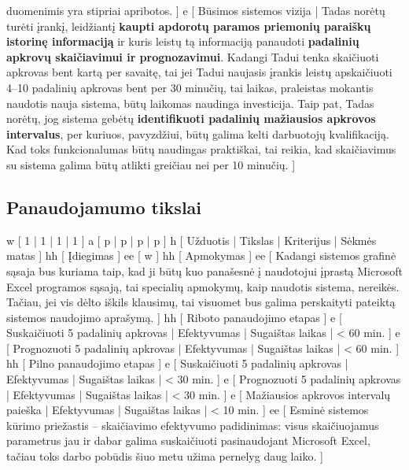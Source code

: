 {    duomenimis yra stipriai apribotos.
  ]
  e [ Būsimos sistemos vizija
  | 
    Tadas norėtų turėti įrankį, leidžiantį \textbf{kaupti apdorotų paramos priemonių paraiškų
    istorinę informaciją} ir kuris leistų tą informaciją panaudoti \textbf{padalinių apkrovų 
    skaičiavimui ir prognozavimui}.
    Kadangi Tadui tenka skaičiuoti apkrovas bent kartą per savaitę, tai jei Tadui naujasis 
    įrankis leistų apskaičiuoti 4–10 padalinių apkrovas bent per 30 minučių, 
    tai laikas, praleistas mokantis naudotis nauja sistema, būtų laikomas naudinga investicija.
    Taip pat, Tadas norėtų, jog sistema gebėtų \textbf{identifikuoti padalinių
    mažiausios apkrovos intervalus}, per kuriuos, pavyzdžiui, būtų galima kelti darbuotojų
    kvalifikaciją. Kad toks funkcionalumas būtų naudingas praktiškai, tai 
    reikia, kad skaičiavimus su sistema galima būtų atlikti greičiau
    nei per 10 minučių.
  ]
}

\subsection{Panaudojamumo tikslai}
\xtable
{
  w [ 1 | 1 | 1 | 1 ]
  a [ p | p | p | p ]
  h [ Užduotis | Tikslas | Kriterijus | Sėkmės matas ]
  hh [ Įdiegimas ]
  ee [ w ]
  hh [ Apmokymas ]
  ee 
  [ 
    Kadangi sistemos grafinė sąsaja bus kuriama taip, kad ji būtų kuo
    panašesnė į naudotojui įprastą Microsoft Excel programos sąsają,
    tai specialių apmokymų, kaip naudotis sistema, nereikės. Tačiau,
    jei vis dėlto iškils klausimų, tai visuomet bus galima perskaityti
    pateiktą sistemos naudojimo aprašymą.
  ]
  hh [ Riboto panaudojimo etapas ]
  e [ Suskaičiuoti 5 padalinių apkrovas | Efektyvumas | Sugaištas laikas | < 60 min. ]
  e [ Prognozuoti 5 padalinių apkrovas | Efektyvumas | Sugaištas laikas | < 60 min. ]
  hh [ Pilno panaudojimo etapas ]
  e [ Suskaičiuoti 5 padalinių apkrovas | Efektyvumas | Sugaištas laikas | < 30 min. ]
  e [ Prognozuoti 5 padalinių apkrovas | Efektyvumas | Sugaištas laikas | < 30 min. ]
  e [ Mažiausios apkrovos intervalų paieška | Efektyvumas | Sugaištas laikas | < 10 min. ]
  ee 
  [ 
    Esminė sistemos kūrimo priežastis – skaičiavimo efektyvumo padidinimas: visus skaičiuojamus
    parametrus jau ir dabar galima suskaičiuoti pasinaudojant Microsoft Excel, tačiau toks
    darbo pobūdis šiuo metu užima pernelyg daug laiko.
  ]
}

